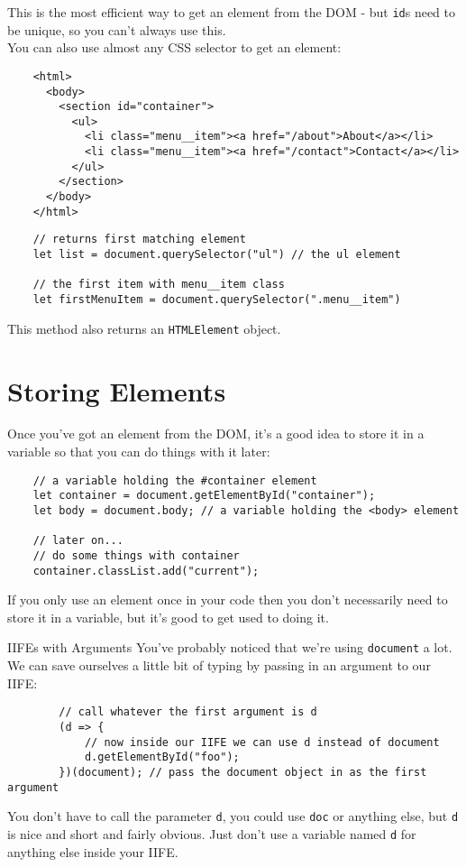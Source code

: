 This is the most efficient way to get an element from the DOM - but \texttt{id}s need to be unique, so you can't always use this.
\\


You can also use almost any CSS selector to get an element:

\begin{verbatim}
    <html>
      <body>
        <section id="container">
          <ul>
            <li class="menu__item"><a href="/about">About</a></li>
            <li class="menu__item"><a href="/contact">Contact</a></li>
          </ul>
        </section>
      </body>
    </html>
\end{verbatim}

\begin{verbatim}
    // returns first matching element
    let list = document.querySelector("ul") // the ul element

    // the first item with menu__item class
    let firstMenuItem = document.querySelector(".menu__item")
\end{verbatim}

This method also returns an \texttt{HTMLElement} object.


\section{Storing Elements}

Once you've got an element from the DOM, it's a good idea to store it in a variable so that you can do things with it later:

\begin{verbatim}
    // a variable holding the #container element
    let container = document.getElementById("container");
    let body = document.body; // a variable holding the <body> element

    // later on...
    // do some things with container
    container.classList.add("current");
\end{verbatim}

If you only use an element once in your code then you don't necessarily need to store it in a variable, but it's good to get used to doing it.



\begin{infobox}{IIFEs with Arguments}
    You've probably noticed that we're using \texttt{document} a lot. We can save ourselves a little bit of typing by passing in an argument to our IIFE:

    \begin{verbatim}
        // call whatever the first argument is d
        (d => {
            // now inside our IIFE we can use d instead of document
            d.getElementById("foo");
        })(document); // pass the document object in as the first argument
    \end{verbatim}

    You don't have to call the parameter \texttt{d}, you could use \texttt{doc} or anything else, but \texttt{d} is nice and short and fairly obvious. Just don't use a variable named \texttt{d} for anything else inside your IIFE.
\end{infobox}


